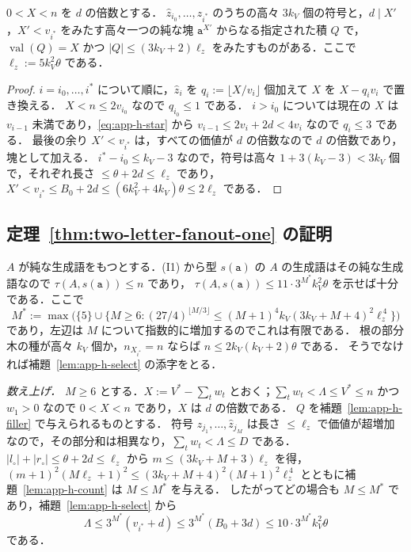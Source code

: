 \begin{lemma}[埋め草]
\label{lem:app-h-filler}
$0<X<n$ を $d$ の倍数とする．
$\hat z_{i_0},\ldots,\hat z_{i^*}$ のうちの高々 $3k_V$ 個の符号と，$d\mid X'$，$X'<v_{i^*}$ をみたす高々一つの純な塊 $\mathtt a^{X'}$ からなる指定された積 $Q$ で，
$\operatorname{val}(Q)=X$ かつ $|Q|\le(3k_V+2)\ell_z$ をみたすものがある．ここで $\ell_z:=5k_V^2\theta$ である．
\end{lemma}

\begin{proof}
$i=i_0,\ldots,i^*$ について順に，$\hat z_i$ を $q_i:=\lfloor X/v_i\rfloor$ 個加えて $X$ を $X-q_iv_i$ で置き換える．
$X<n\le2v_{i_0}$ なので $q_{i_0}\le1$ である．
$i>i_0$ については現在の $X$ は $v_{i-1}$ 未満であり，\eqref{eq:app-h-star} から $v_{i-1}\le2v_i+2d<4v_i$ なので $q_i\le3$ である．
最後の余り $X'<v_{i^*}$ は，すべての価値が $d$ の倍数なので $d$ の倍数であり，塊として加える．
$i^*-i_0\le k_V-3$ なので，符号は高々 $1+3(k_V-3)<3k_V$ 個で，それぞれ長さ $\le\theta+2d\le\ell_z$ であり，
$X'<v_{i^*}\le B_0+2d\le(6k_V^2+4k_V)\theta\le2\ell_z$ である．
\end{proof}

\subsection{定理~\ref{thm:two-letter-fanout-one} の証明}

$A$ が純な生成語をもつとする．(I1) から型 $s(\mathtt a)$ の $A$ の生成語はその純な生成語なので $\tau(A,s(\mathtt a))\le n$ であり，
$\tau(A,s(\mathtt a))\le11\cdot3^{M^*}k_V^2\theta$ を示せば十分である．ここで
\[
 M^*:=\max\bigl(\{5\}\cup\{M\ge6:(27/4)^{\lfloor M/3\rfloor}
 \le(M+1)^4k_V(3k_V+M+4)^2\ell_z^{\,4}\}\bigr)
\]
であり，左辺は $M$ について指数的に増加するのでこれは有限である．
根の部分木の種が高々 $k_V$ 個か，$n_{X_{i^*}}=n$ ならば $n\le2k_V(k_V+2)\theta$ である．
そうでなければ補題~\ref{lem:app-h-select} の添字をとる．

\emph{数え上げ．}
$M\ge6$ とする．$X:=V^*-\sum_tw_t$ とおく；$\sum_tw_t<\Lambda\le V^*\le n$ かつ $w_1>0$ なので $0<X<n$ であり，$X$ は $d$ の倍数である．
$Q$ を補題~\ref{lem:app-h-filler} で与えられるものとする．
符号 $\hat z_{j_1},\ldots,\hat z_{j_M}$ は長さ $\le\ell_z$ で価値が超増加なので，その部分和は相異なり，$\sum_tw_t<\Lambda\le D$ である．
$|l_\circ|+|r_\circ|\le\theta+2d\le\ell_z$ から $m\le(3k_V+M+3)\ell_z$ を得，
$(m+1)^2(M\ell_z+1)^2\le(3k_V+M+4)^2(M+1)^2\ell_z^{\,4}$ とともに補題~\ref{lem:app-h-count} は $M\le M^*$ を与える．
したがってどの場合も $M\le M^*$ であり，補題~\ref{lem:app-h-select} から
\[
 \Lambda\le3^{M^*}(v_{i^*}+d)\le3^{M^*}(B_0+3d)\le10\cdot3^{M^*}k_V^2\theta
\]
である．

